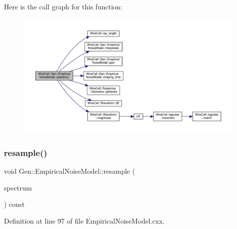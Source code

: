 Here is the call graph for this function\+:
\nopagebreak
\begin{figure}[H]
\begin{center}
\leavevmode
\includegraphics[width=350pt]{class_wire_cell_1_1_gen_1_1_empirical_noise_model_a9ed3c28256c1c262064c62816b4b225f_cgraph}
\end{center}
\end{figure}
\mbox{\label{class_wire_cell_1_1_gen_1_1_empirical_noise_model_a35db0e36d1426041740535fc2da0b07d}} 
\subsubsection{\texorpdfstring{resample()}{resample()}}
{\footnotesize\ttfamily void Gen\+::\+Empirical\+Noise\+Model\+::resample (\begin{DoxyParamCaption}\item[{\hyperlink{struct_wire_cell_1_1_gen_1_1_empirical_noise_model_1_1_noise_spectrum}{Noise\+Spectrum} \&}]{spectrum }\end{DoxyParamCaption}) const}



Definition at line 97 of file Empirical\+Noise\+Model.\+cxx.

